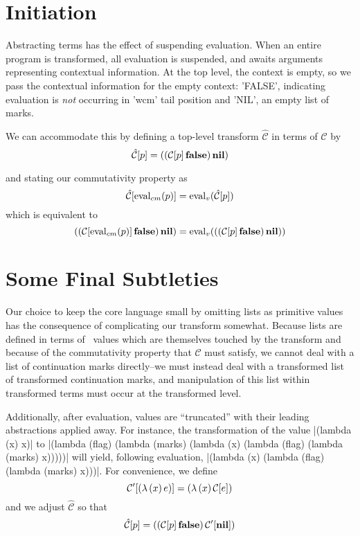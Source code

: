 \section{Initiation}

Abstracting terms has the effect of suspending evaluation. When an entire program is transformed, all evaluation is suspended, and awaits arguments representing contextual information. At the top level, the context is empty, so we pass the contextual information for the empty context: \scheme'FALSE', indicating evaluation is \emph{not} occurring in \scheme'wcm' tail position and \scheme'NIL', an empty list of marks.

We can accommodate this by defining a top-level transform $\hat{\mathcal{C}}$ in terms of $\mathcal{C}$ by
\begin{equation}
\hat{\mathcal{C}}[p]=((\mathcal{C}[p]\,\mathbf{false})\,\mathbf{nil})
\end{equation}

and stating our commutativity property as
\begin{equation}
\label{commutativity-property}
\hat{\mathcal{C}}[\mathrm{eval}_{cm}(p)]=\mathrm{eval}_v(\hat{\mathcal{C}}[p])
\end{equation}
which is equivalent to
\begin{equation}
((\mathcal{C}[\mathrm{eval}_{cm}(p)]\,\mathbf{false})\,\mathbf{nil})=\mathrm{eval}_v(((\mathcal{C}[p]\,\mathbf{false})\,\mathbf{nil}))
\end{equation}

\section{Some Final Subtleties}

Our choice to keep the core language small by omitting lists as primitive values has the consequence of complicating our transform somewhat. Because lists are defined in terms of \lc\ values which are themselves touched by the transform and because of the commutativity property that $\mathcal{C}$ must satisfy, we cannot deal with a list of continuation marks directly--we must instead deal with a transformed list of transformed continuation marks, and manipulation of this list within transformed terms must occur at the transformed level.

Additionally, after evaluation, values are ``truncated'' with their leading abstractions applied away. For instance, the transformation of the value \scheme|(lambda (x) x)| to \scheme|(lambda (flag) (lambda (marks) (lambda (x) (lambda (flag) (lambda (marks) x)))))| will yield, following evaluation, \scheme|(lambda (x) (lambda (flag) (lambda (marks) x)))|. For convenience, we define 
\begin{equation}
\mathcal{C}'[(\lambda\,(x)\,e)]=(\lambda\,(x)\,\mathcal{C}[e])
\end{equation}
and we adjust $\hat{\mathcal{C}}$ so that
\begin{equation}
\hat{\mathcal{C}}[p]=((\mathcal{C}[p]\,\mathbf{false})\,\mathcal{C}'[\mathbf{nil}])
\end{equation}

